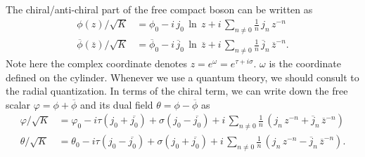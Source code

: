 \documentclass[submission, PhysLectNotes]{SciPost}
\begin{document}
The chiral/anti-chiral part of the free compact boson can be written as 
\begin{equation}
	\begin{split}
		\phi(z)/\sqrt{K} &= \phi_0 -i\,j_0\,\ln \,z + i\,\sum_{n\neq0} \frac{1}{n}\,j_n\,z^{-n} \\
		\overline{\phi}(\overline{z})/\sqrt{K} &= \overline{\phi}_0 -i\,\overline{j}_0\,\ln \, \overline{z} + i\,\sum_{n\neq0} \frac{1}{n}\,\overline{j}_n\,{\overline{z}}^{-n}.
	\end{split}
\end{equation} 
Note here the complex coordinate denotes $z = e^\omega = e^{\tau + i\sigma}$. $\omega$ is the coordinate defined on the cylinder. Whenever we use a quantum theory, we should consult to the radial quantization. In terms of the chiral term, we can write down the free scalar $\varphi = \phi + \overline{\phi}$ and its dual field $\theta = \phi - \overline{\phi}$ as
\begin{equation}
	\begin{split}
		\varphi/\sqrt{K} &= \varphi_0 -i \tau \left(j_0 + \overline{j_0}\right) + \sigma \left(j_0 - \overline{j_0}\right) + i\,\sum_{n\neq0} \frac{1}{n}\,\left( j_n\,z^{-n}+ \overline{j}_n\,{\overline{z}}^{-n}\right)\\
		\theta/\sqrt{K} &= \theta_0 -i \tau \left(j_0 - \overline{j_0}\right) + \sigma \left(j_0 + \overline{j_0}\right) + i\,\sum_{n\neq0} \frac{1}{n}\,\left( j_n\,z^{-n}- \overline{j}_n\,{\overline{z}}^{-n}\right).
	\end{split}
\end{equation}
\end{document}
